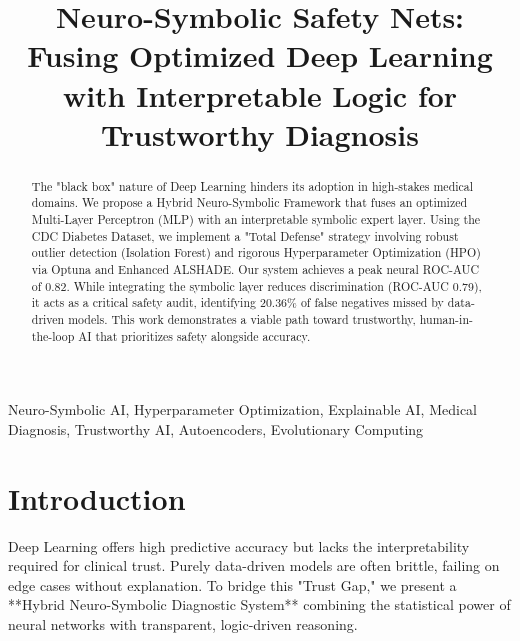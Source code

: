 \documentclass[conference]{IEEEtran}
\begin{document}
\title{Neuro-Symbolic Safety Nets: Fusing Optimized Deep Learning with Interpretable Logic for Trustworthy Diagnosis}

\author{
}

\maketitle

\begin{abstract} 
The "black box" nature of Deep Learning hinders its adoption in high-stakes medical domains. We propose a Hybrid Neuro-Symbolic Framework that fuses an optimized Multi-Layer Perceptron (MLP) with an interpretable symbolic expert layer. Using the CDC Diabetes Dataset, we implement a "Total Defense" strategy involving robust outlier detection (Isolation Forest) and rigorous Hyperparameter Optimization (HPO) via Optuna and Enhanced ALSHADE. Our system achieves a peak neural ROC-AUC of 0.82. While integrating the symbolic layer reduces discrimination (ROC-AUC 0.79), it acts as a critical safety audit, identifying 20.36\% of false negatives missed by data-driven models. This work demonstrates a viable path toward trustworthy, human-in-the-loop AI that prioritizes safety alongside accuracy.
\end{abstract}

\begin{IEEEkeywords}
Neuro-Symbolic AI, Hyperparameter Optimization, Explainable AI, Medical Diagnosis, Trustworthy AI, Autoencoders, Evolutionary Computing
\end{IEEEkeywords}

\section{Introduction}
Deep Learning offers high predictive accuracy but lacks the interpretability required for clinical trust. Purely data-driven models are often brittle, failing on edge cases without explanation. To bridge this "Trust Gap," we present a **Hybrid Neuro-Symbolic Diagnostic System** combining the statistical power of neural networks with transparent, logic-driven reasoning.
\end{document}

